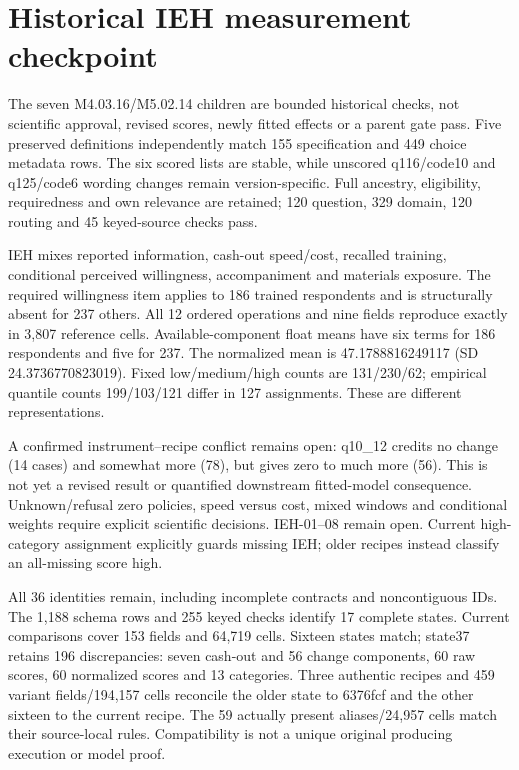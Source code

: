 \documentclass[11pt,a4paper]{article}
\begin{document}
\section{Historical IEH measurement checkpoint}
The seven M4.03.16/M5.02.14 children are bounded historical checks,
not scientific approval, revised scores, newly fitted effects or a parent gate pass.
Five preserved definitions independently match 155 specification and 449
choice metadata rows. The six scored lists are stable, while unscored
q116/code10 and q125/code6 wording changes remain version-specific.
Full ancestry, eligibility, requiredness and own relevance are retained;
120 question, 329 domain, 120 routing and 45 keyed-source checks pass.

IEH mixes reported information, cash-out speed/cost, recalled training,
conditional perceived willingness, accompaniment and materials exposure.
The required willingness item applies to 186 trained respondents and is
structurally absent for 237 others. All 12 ordered operations and nine
fields reproduce exactly in 3,807 reference cells. Available-component
float means have six terms for 186 respondents and five for 237.
The normalized mean is 47.1788816249117 (SD 24.3736770823019).
Fixed low/medium/high counts are 131/230/62; empirical quantile counts
199/103/121 differ in 127 assignments. These are different representations.

A confirmed instrument--recipe conflict remains open: q10\_12 credits
no change (14 cases) and somewhat more (78), but gives zero to
much more (56). This is not yet a revised result or quantified
downstream fitted-model consequence. Unknown/refusal zero policies,
speed versus cost, mixed windows and conditional weights require explicit
scientific decisions. IEH-01--08 remain open.
Current high-category assignment explicitly guards missing IEH;
older recipes instead classify an all-missing score high.

All 36 identities remain, including incomplete contracts and noncontiguous
IDs. The 1,188 schema rows and 255 keyed checks identify 17 complete states.
Current comparisons cover 153 fields and 64,719 cells. Sixteen states match;
state37 retains 196 discrepancies: seven cash-out and 56 change components,
60 raw scores, 60 normalized scores and 13 categories. Three authentic
recipes and 459 variant fields/194,157 cells reconcile the older state
to 6376fcf and the other sixteen to the current recipe. The 59 actually
present aliases/24,957 cells match their source-local rules.
Compatibility is not a unique original producing execution or model proof.
\end{document}
